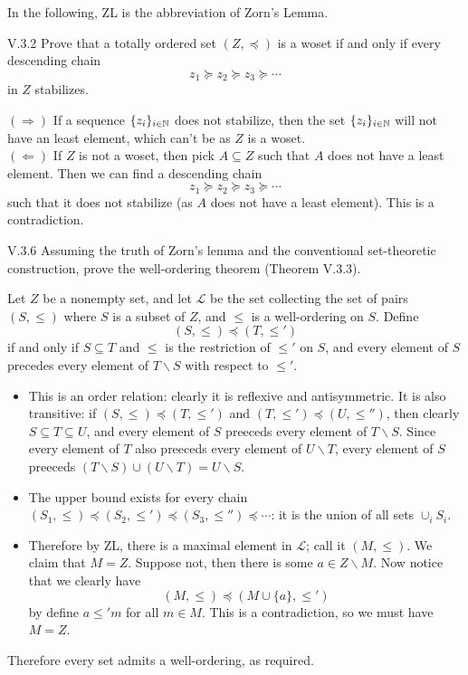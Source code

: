 \section{}

In the following, ZL is the abbreviation of Zorn's Lemma.

\begin{problem}{V.3.2}
Prove that a totally ordered set $(Z, \preceq)$ is a woset if and only if every descending chain
\[
z_1 \succeq z_2 \succeq z_3 \succeq \cdots
\]
in $Z$ stabilizes.
\end{problem}
\begin{pf}

\noindent $(\Rightarrow)$ If a sequence $\{z_i\}_{i \in \mathbb{N}}$ does not stabilize, then the set $\{z_i\}_{i \in \mathbb{N}}$ will not have an least element, which can't be as $Z$ is a woset. \\
$(\Leftarrow)$ If $Z$ is not a woset, then pick $A \subseteq Z$ such that $A$ does not have a least element. Then we can find a descending chain
\[
z_1 \succeq z_2 \succeq z_3 \succeq \cdots
\]
such that it does not stabilize (as $A$ does not have a least element). This is a contradiction.
\end{pf}

\begin{problem}{V.3.6}
Assuming the truth of Zorn's lemma and the conventional set-theoretic construction, prove the well-ordering theorem (Theorem V.3.3).
\end{problem}
\begin{pf}
Let $Z$ be a nonempty set, and let $\mathscr{L}$ be the set collecting the set of pairs $(S,\leq)$ where $S$ is a subset of $Z$, and $\leq$ is a well-ordering on $S$. Define
\[
(S,\leq) \preceq (T,\leq')
\]
if and only if $S \subseteq T$ and $\leq$ is the restriction of $\leq'$ on $S$, and every element of $S$ precedes every element of $T \backslash S$ with respect to $\leq'$.
\begin{itemize}
	\setlength\itemsep{0pt}
	\item This is an order relation: clearly it is reflexive and antisymmetric. It is also transitive: if $(S,\leq) \preceq (T,\leq')$ and $(T,\leq') \preceq (U,\leq'')$, then clearly $S \subseteq T \subseteq U$, and every element of $S$ preeceds every element of $T \backslash S$. Since every element of $T$ also preeceds every element of $U \backslash T$, every element of $S$ preeceds $(T \backslash S) \cup (U \backslash T) = U \backslash S$.
	\item The upper bound exists for every chain $(S_1,\leq) \preceq (S_2,\leq') \preceq (S_3,\leq'') \preceq \cdots$: it is the union of all sets $\cup_{i} S_i$.  
	\item Therefore by ZL, there is a maximal element in $\mathscr{L}$; call it $(M, \leq)$. We claim that $M = Z$. Suppose not, then there is some $a \in Z \backslash M$. Now notice that we clearly have
	\[
	(M, \leq) \preceq (M \cup \{a\}, \leq')
	\]
	by define $a \leq' m$ for all $m \in M$. This is a contradiction, so we must have $M = Z$.
\end{itemize}
Therefore every set admits a well-ordering, as required.
\end{pf}

